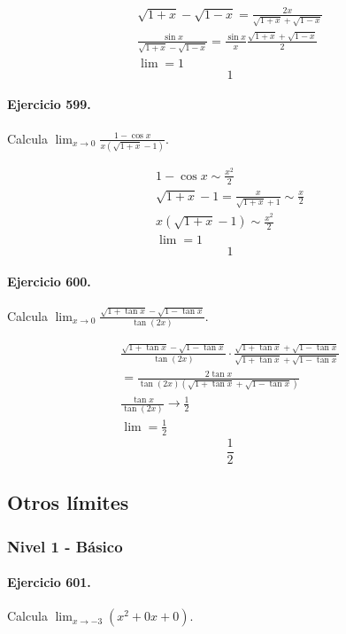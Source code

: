 \documentclass[11pt,a4paper]{article}
\begin{document}
\[
\begin{aligned}
\sqrt{1+x}-\sqrt{1-x}=\frac{2x}{\sqrt{1+x}+\sqrt{1-x}}\\
\frac{\sin x}{\sqrt{1+x}-\sqrt{1-x}}=\frac{\sin x}{x}\frac{\sqrt{1+x}+\sqrt{1-x}}{2}\\
\lim=1
\end{aligned}
\]
\[\boxed{1}\]


\paragraph{Ejercicio 599.} Calcula $\displaystyle \lim_{x\to0}\frac{1-\cos x}{x(\sqrt{1+x}-1)}$.

\[
\begin{aligned}
1-\cos x\sim\frac{x^2}{2}\\
\sqrt{1+x}-1=\frac{x}{\sqrt{1+x}+1}\sim\frac{x}{2}\\
x(\sqrt{1+x}-1)\sim\frac{x^2}{2}\\
\lim=1
\end{aligned}
\]
\[\boxed{1}\]


\paragraph{Ejercicio 600.} Calcula $\displaystyle \lim_{x\to0}\frac{\sqrt{1+\tan x}-\sqrt{1-\tan x}}{\tan(2x)}$.

\[
\begin{aligned}
\frac{\sqrt{1+\tan x}-\sqrt{1-\tan x}}{\tan(2x)}\cdot\frac{\sqrt{1+\tan x}+\sqrt{1-\tan x}}{\sqrt{1+\tan x}+\sqrt{1-\tan x}}\\
=\frac{2\tan x}{\tan(2x)(\sqrt{1+\tan x}+\sqrt{1-\tan x})}\\
\frac{\tan x}{\tan(2x)}\to\frac12\\
\lim=\frac12
\end{aligned}
\]
\[\boxed{\frac12}\]


\newpage

\subsection*{Otros límites}


\subsubsection*{Nivel 1 - Básico}

\paragraph{Ejercicio 601.} Calcula $\displaystyle\lim_{x\to -3}(x^2+0x+0)$.
\end{document}
